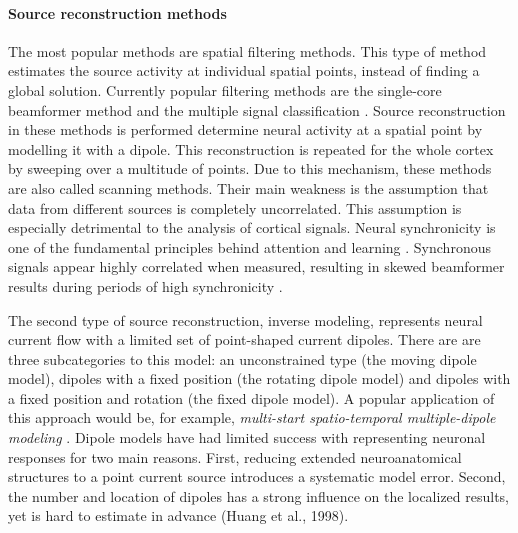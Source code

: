 \paragraph{Source reconstruction methods}
The most popular methods are spatial filtering methods.
This type of method estimates the source activity at individual spatial points, instead of finding a global solution.
Currently popular filtering methods are the single-core beamformer method \cite{1.5.Beamformer-a, 1.5.Beamformer-b} and the multiple signal classification \cite{1.5.music}.
Source reconstruction in these methods is performed determine neural activity at a spatial point by modelling it with a dipole.
This reconstruction is repeated for the whole cortex by sweeping over a multitude of points.
Due to this mechanism, these methods are also called scanning methods.
Their main weakness is the assumption that data from different sources is completely uncorrelated.
This assumption is especially detrimental to the analysis of cortical signals.
Neural synchronicity is one of the fundamental principles behind attention and learning \cite{1.5.synchronicity}.
Synchronous signals appear highly correlated when measured, resulting in skewed beamformer results during periods of high synchronicity \cite{1.5.Beamformer.Problems}. 

The second type of source reconstruction, inverse modeling, represents neural current flow with a limited set of point-shaped current dipoles.
There are are three subcategories to this model: an unconstrained type (the moving dipole model), dipoles with a fixed position (the rotating dipole model) and dipoles with a fixed position and rotation (the fixed dipole model).
A popular application of this approach would be, for example, \emph{multi-start spatio-temporal multiple-dipole modeling} \cite{1.5.simplex}.
Dipole models have had limited success with representing neuronal responses for two main reasons.
First, reducing extended neuroanatomical structures to a point current source introduces a systematic model error.
Second, the number and location of dipoles has a strong influence on the localized results, yet is hard to estimate in advance (Huang et al., 1998).


